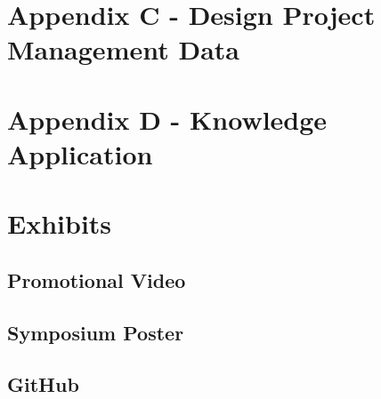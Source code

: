 \documentclass[a4paper,11pt]{article}
\begin{document}
\newpage
\section{Appendix C - Design Project Management Data}


\section{Appendix D - Knowledge Application}

\section{Exhibits}
\subsection{Promotional Video}
\subsection{Symposium Poster}
\subsection{GitHub}
\end{document}
